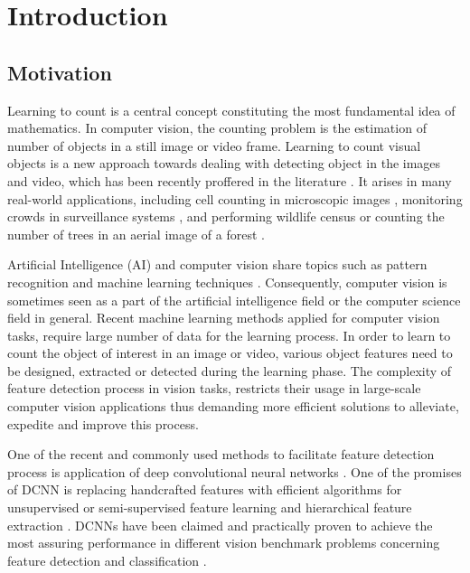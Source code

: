 \chapter{Introduction}
\label{sec:introduction}
\section{Motivation}
Learning to count is a central concept constituting the most fundamental idea of mathematics. In computer vision, the counting problem is the estimation of number of objects in a still image or video frame. Learning to count visual objects is a new approach towards dealing with detecting object in the images and video, which has been recently proffered in the literature \cite{rabaud2006counting, kong2005counting, chan2008privacy, segui2015learning}. It arises in many real-world applications, including cell counting in microscopic images \cite{flaccavento2011learning}, monitoring crowds in surveillance systems \cite{rahmalan2006crowd}, and performing wildlife census or counting the number of trees in an aerial image of a forest \cite{pollock1996automatic,NIPS2010_4043}. 

Artificial Intelligence (AI) and computer vision share topics such as pattern recognition and machine learning techniques \cite{mitchell1997machine}. Consequently, computer vision is sometimes seen as a part of the artificial intelligence field or the computer science field in general. Recent machine learning methods applied for computer vision tasks, require large number of data for the learning process. In order to learn to count the object of interest in an image or video, various object features need to be designed, extracted or detected during the learning phase. The complexity of feature detection process in vision tasks, restricts their usage in large-scale computer vision applications thus demanding more efficient solutions to alleviate, expedite and improve this process. 

\indent One of the recent and commonly used methods to facilitate feature detection process is application of deep convolutional neural networks \cite{szegedy2015going, krizhevsky2012imagenet, lecun1995convolutional}. One of the promises of DCNN is replacing handcrafted features with efficient algorithms for unsupervised or semi-supervised feature learning and hierarchical feature extraction \cite{song2013hierarchical}. DCNNs have been claimed and practically proven to achieve the most assuring performance in different vision benchmark problems concerning feature detection and classification \cite{szegedy2015going, ciresan2012multi}. 


